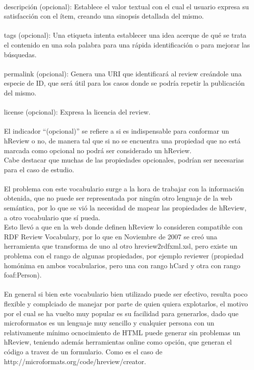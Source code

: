 \\
descripción (opcional): Establece el valor textual con el cual el usuario expresa su satisfacción con el ítem, creando una 
sinopsis detallada del mismo. \\
\\
tags (opcional): Una etiqueta intenta establecer una idea acerque de qué se trata el contenido en una sola palabra para una rápida identificación 
o para mejorar las búsquedas. \\
\\
permalink (opcional): Genera una URI que identificará al review creándole una especie de ID, que será útil para los casos donde 
se podría repetir la publicación del mismo. \\
\\
license (opcional): Expresa la licencia del review.\\
\\
El indicador ``(opcional)'' se refiere a si es indispensable para conformar un hReview o no, de manera tal que si no se encuentra una 
propiedad que no está marcada como opcional no podrá ser considerado un hReview.\\
Cabe destacar que muchas de las propiedades opcionales, podrían ser necesarias para el caso de estudio.\\
\\
El problema con este vocabulario surge a la hora de trabajar con la información obtenida, que no puede ser representada por ningún otro 
lenguaje de la web semántica, por lo que se vió la necesidad de mapear las propiedades de hReview, a otro vocabulario que sí pueda.\\
Esto llevó a que en la web donde definen hReview lo consideren compatible con RDF Review Vocabulary, por lo que en Noviembre de 2007 
se creó una herramienta que transforma de uno al otro hreview2rdfxml.xsl,  pero existe un problema con el rango de algunas 
propiedades, por ejemplo reviewer (propiedad homónima en ambos vocabularios, pero una con rango hCard y otra con rango foaf:Person).\\
\\
En general si bien este vocabulario bien utilizado puede ser efectivo, resulta poco flexible y complciado de manejar por parte 
de quien quiera explotarlos, el motivo por el cual se ha vuelto muy popular es su facilidad para generarlos, dado que 
microformatos es un lenguaje muy sencillo y cualquier persona con un relativamente mínimo ocnocimiento de HTML puede generar 
sin problemas un hReview, teniendo además herramientas online como opción, que generan el código a travez de un formulario. 
Como es el caso de http://microformats.org/code/hreview/creator. 